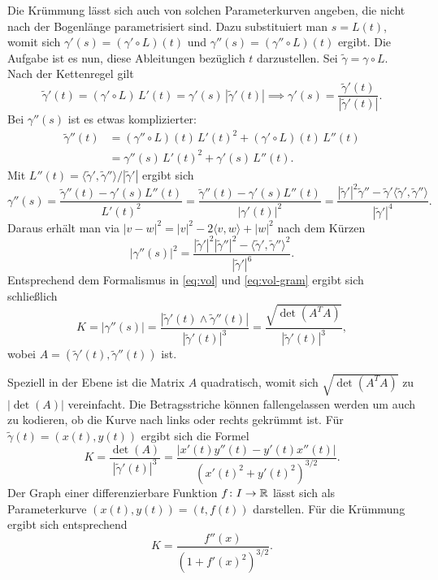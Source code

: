 Die Krümmung lässt sich auch von solchen Parameterkurven angeben,
die nicht nach der Bogenlänge parametrisiert sind. Dazu substituiert
man $s=L(t)$, womit sich $\gamma'(s) = (\gamma'\circ L)(t)$ und
$\gamma''(s)=(\gamma''\circ L)(t)$ ergibt. Die Aufgabe ist es nun, diese
Ableitungen bezüglich $t$ darzustellen. Sei $\tilde\gamma = \gamma\circ L$.
Nach der Kettenregel gilt%
\begin{equation}
\tilde\gamma'(t) = (\gamma'\circ L)\,L'(t) = \gamma'(s)\,|\tilde\gamma'(t)|
\implies \gamma'(s) = \frac{\tilde\gamma'(t)}{|\tilde\gamma'(t)|}.
\end{equation}
Bei $\gamma''(s)$ ist es etwas komplizierter:
\begin{align}
\tilde\gamma''(t)
&= (\gamma''{\circ}L)(t)\,L'(t)^2+(\gamma'{\circ}L)(t)\,L''(t)\\
&= \gamma''(s)\,L'(t)^2+\gamma'(s)\,L''(t).
\end{align}
Mit $L''(t)=\langle\tilde\gamma',\tilde\gamma''\rangle/|\tilde\gamma'|$
ergibt sich
\begin{equation}
\gamma''(s) = \frac{\tilde\gamma''(t)-\gamma'(s)L''(t)}{L'(t)^2}
= \frac{\tilde\gamma''(t)-\gamma'(s)L''(t)}{|\gamma'(t)|^2}
= \frac{
|\tilde\gamma'|^2\tilde\gamma''
-\tilde\gamma'\langle\tilde\gamma',\tilde\gamma''\rangle
}{|\tilde\gamma'|^4}.
\end{equation}
Daraus erhält man via $|v-w|^2 = |v|^2-2\langle v,w\rangle+|w|^2$ nach
dem Kürzen
\begin{equation}
|\gamma''(s)|^2 = \frac{
|\tilde\gamma'|^2|\tilde\gamma''|^2
-\langle\tilde\gamma',\tilde\gamma''\rangle^2
}{|\tilde\gamma'|^6}.
\end{equation}
Entsprechend dem Formalismus in \eqref{eq:vol} und \eqref{eq:vol-gram}
ergibt sich schließlich
\begin{equation}\label{eq:Kruemmung-t}
K = |\gamma''(s)| = \frac{|\tilde\gamma'(t)\wedge\tilde\gamma''(t)|}{|\tilde\gamma'(t)|^3}
= \frac{\sqrt{\det(A^T A)}}{|\tilde\gamma'(t)|^3},
\end{equation}
wobei $A=(\tilde\gamma'(t),\tilde\gamma''(t))$ ist.

Speziell in der Ebene ist die
Matrix $A$ quadratisch, womit sich $\sqrt{\det(A^T A)}$
zu $|\det(A)|$ vereinfacht. Die Betragsstriche können fallengelassen
werden um auch zu kodieren, ob die Kurve nach links oder rechts
gekrümmt ist. Für $\tilde\gamma(t)=(x(t),y(t))$ ergibt
sich die Formel%
\begin{equation}\label{eq:Kruemmung-t-Ebene}
K = \frac{\det(A)}{|\tilde\gamma'(t)|^3}
= \frac{|x'(t)y''(t)-y'(t)x''(t)|}{(x'(t)^2+y'(t)^2)^{3/2}}.
\end{equation}
Der Graph einer differenzierbare Funktion $f\colon I\to \mathbb R$ lässt sich
als Parameterkurve $(x(t),y(t))=(t,f(t))$ darstellen. Für die
Krümmung ergibt sich entsprechend
\begin{equation}
K = \frac{f''(x)}{(1+f'(x)^2)^{3/2}}.
\end{equation}

